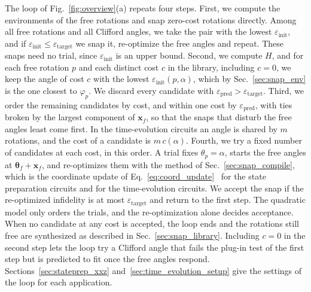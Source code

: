 The loop of Fig.~\ref{fig:overview}(a) repeats four steps. First, we compute the environments of the free rotations and snap zero-cost rotations directly. Among all free rotations and all Clifford angles, we take the pair with the lowest $\varepsilon_{\mathrm{init}}$, and if $\varepsilon_{\mathrm{init}} \leq \varepsilon_{\mathrm{target}}$ we snap it, re-optimize the free angles and repeat. These snaps need no trial, since $\varepsilon_{\mathrm{init}}$ is an upper bound. Second, we compute $H$, and for each free rotation $p$ and each distinct cost $c$ in the library, including $c = 0$, we keep the angle of cost $c$ with the lowest $\varepsilon_{\mathrm{init}}(p, \alpha)$, which by Sec.~\ref{sec:snap_env} is the one closest to $\varphi_p$. We discard every candidate with $\varepsilon_{\mathrm{pred}} > \varepsilon_{\mathrm{target}}$. Third, we order the remaining candidates by cost, and within one cost by $\varepsilon_{\mathrm{pred}}$, with ties broken by the largest component of $\mathbf{x}_f$, so that the snaps that disturb the free angles least come first. In the time-evolution circuits an angle is shared by $m$ rotations, and the cost of a candidate is $m\, c(\alpha)$. Fourth, we try a fixed number of candidates at each cost, in this order. A trial fixes $\theta_p = \alpha$, starts the free angles at $\boldsymbol{\theta}_f + \mathbf{x}_f$, and re-optimizes them with the method of Sec.~\ref{sec:snap_compile}, which is the coordinate update of Eq.~\eqref{eq:coord_update}~\cite{Nakanishi2020, Ostaszewski2021} for the state preparation circuits and  for the time-evolution circuits. We accept the snap if the re-optimized infidelity is at most $\varepsilon_{\mathrm{target}}$ and return to the first step. The quadratic model only orders the trials, and the re-optimization alone decides acceptance. When no candidate at any cost is accepted, the loop ends and the rotations still free are synthesized as described in Sec.~\ref{sec:snap_library}. Including $c = 0$ in the second step lets the loop try a Clifford angle that fails the plug-in test of the first step but is predicted to fit once the free angles respond. Sections~\ref{sec:stateprep_xxz} and~\ref{sec:time_evolution_setup} give the settings of the loop for each application.

